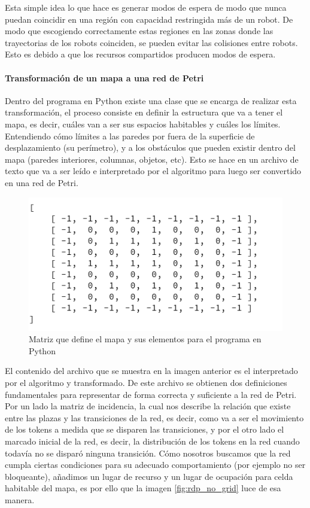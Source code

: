 Esta simple idea lo que hace es generar modos de espera de modo que nunca puedan coincidir en una región con capacidad restringida más de un robot. De modo que escogiendo correctamente estas regiones en las zonas donde las trayectorias de los robots coinciden, se pueden evitar las colisiones entre robots. Esto es debido a que los recursos compartidos producen modos de espera.

\paragraph{Transformación de un mapa a una red de Petri} \mbox{} \vspace{10pt}

Dentro del programa en Python existe una clase que se encarga de realizar esta transformación, el proceso consiste en definir la estructura que va a tener el mapa, es decir, cuáles van a ser sus espacios habitables y cuáles los límites. Entendiendo cómo límites a las paredes por fuera de la superficie de desplazamiento (su perímetro), y a los obstáculos que pueden existir dentro del mapa (paredes interiores, columnas, objetos, etc). Esto se hace en un archivo de texto que va a ser leído e interpretado por el algoritmo para luego ser convertido en una red de Petri.

\begin{figure}[H]
   \centering
   \includegraphics[width=0.6\linewidth]{images/map_definition.png}
   \caption{Matriz que define el mapa y sus elementos para el programa en Python}
   \label{fig:map_definition}
\end{figure}

El contenido del archivo que se muestra en la imagen anterior es el interpretado por el algoritmo y transformado. De este archivo se obtienen dos definiciones fundamentales para representar de forma correcta y suficiente a la red de Petri. Por un lado la matriz de incidencia, la cual nos describe la relación que existe entre las plazas y las transiciones de la red, es decir, como va a ser el movimiento de los tokens a medida que se disparen las transiciones, y por el otro lado el marcado inicial de la red, es decir, la distribución de los tokens en la red cuando todavía no se disparó ninguna transición. Cómo nosotros buscamos que la red cumpla ciertas condiciones para su adecuado comportamiento (por ejemplo no ser bloqueante), añadimos un lugar de recurso y un lugar de ocupación para celda habitable del mapa, es por ello que la imagen \ref{fig:rdp_no_grid} luce de esa manera.

